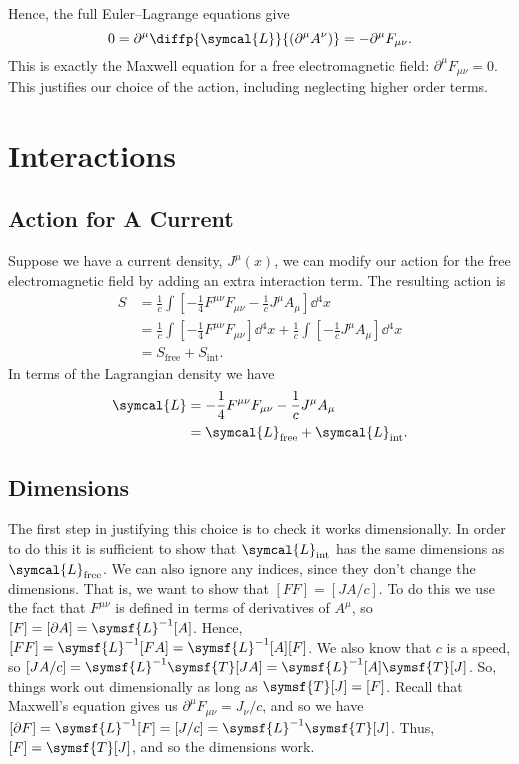 \documentclass[fleqn]{NotesClass}
\newcommand*{\dimension}[1]{\symsf{#1}}
\newcommand*{\lagrangianDensity}{\symcal{L}}
\begin{document}
    Hence, the full Euler--Lagrange equations give
    \begin{equation}\label{eqn:free field eom}
        0 = \partial^\mu \diffp{\lagrangianDensity}{(\partial^\mu A^\nu)} = -\partial^\mu F_{\mu\nu}.
    \end{equation}
    This is exactly the Maxwell equation for a free electromagnetic field: \(\partial^\mu F_{\mu\nu} = 0\).
    This justifies our choice of the action, including neglecting higher order terms.
    
    \chapter{Interactions}
    \section{Action for A Current}
    Suppose we have a current density, \(J^\mu(x)\), we can modify our action for the free electromagnetic field by adding an extra interaction term.
    The resulting action is
    \begin{align}
        S &= \frac{1}{c} \int \left[ -\frac{1}{4}F^{\mu\nu}F_{\mu\nu} - \frac{1}{c}J^\mu A_\mu \right] \dd{^4x}\\
        &= \frac{1}{c} \int \left[ -\frac{1}{4}F^{\mu\nu}F_{\mu\nu} \right] \dd{^4x} + \frac{1}{c} \int \left[ -\frac{1}{c} J^\mu A_\mu \right] \dd{^4x}\\
        &= S_{\text{free}} + S_{\text{int}}.
    \end{align}
    In terms of the Lagrangian density we have
    \begin{align}
        \lagrangianDensity &= -\frac{1}{4}F^{\mu\nu}F_{\mu\nu} - \frac{1}{c}J^\mu A_\mu\\
        &= \lagrangianDensity_{\text{free}} + \lagrangianDensity_{\text{int}}.
    \end{align}
    
    \section{Dimensions}
    The first step in justifying this choice is to check it works dimensionally.
    In order to do this it is sufficient to show that \(\lagrangianDensity_{\text{int}}\) has the same dimensions as \(\lagrangianDensity_{\text{free}}\).
    We can also ignore any indices, since they don't change the dimensions.
    That is, we want to show that \([FF] = [JA/c]\).
    To do this we use the fact that \(F^{\mu\nu}\) is defined in terms of derivatives of \(A^\mu\), so \([F] = [\partial A] = \dimension{L}^{-1}[A]\).
    Hence, \([FF] = \dimension{L}^{-1}[FA] = \dimension{L}^{-1}[A][F]\).
    We also know that \(c\) is a speed, so \([JA/c] = \dimension{L}^{-1}\dimension{T}[JA] = \dimension{L}^{-1}[A]\dimension{T}[J]\).
    So, things work out dimensionally as long as \(\dimension{T}[J] = [F]\).
    Recall that Maxwell's equation gives us \(\partial^\mu F_{\mu\nu} = J_\nu/c\), and so we have \([\partial F] = \dimension{L}^{-1}[F] = [J/c] = \dimension{L}^{-1}\dimension{T}[J]\).
    Thus, \([F] = \dimension{T}[J]\), and so the dimensions work.
    
\end{document}
